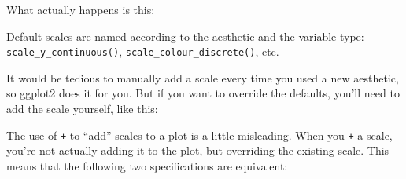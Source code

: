What actually happens is this:

\begin{Shaded}
\begin{Highlighting}[]
\OperatorTok{+}\StringTok{ }
\StringTok{  }\NormalTok{(}\NormalTok{(}\OperatorTok{+}
\StringTok{  }\NormalTok{() }\OperatorTok{+}\StringTok{ }
\StringTok{  }\NormalTok{() }\OperatorTok{+}\StringTok{ }
\StringTok{  }\NormalTok{()}
\end{Highlighting}
\end{Shaded}

Default scales are named according to the aesthetic and the variable
type: \texttt{scale\_y\_continuous()},
\texttt{scale\_colour\_discrete()}, etc.

It would be tedious to manually add a scale every time you used a new
aesthetic, so ggplot2 does it for you. But if you want to override the
defaults, you'll need to add the scale yourself, like this:

\begin{Shaded}
\begin{Highlighting}[]
\OperatorTok{+}\StringTok{ }
\StringTok{  }\NormalTok{(}\NormalTok{(}\OperatorTok{+}\StringTok{ }
\StringTok{  }\NormalTok{(}\NormalTok{) }\OperatorTok{+}
\StringTok{  }\NormalTok{(}\NormalTok{)}
\end{Highlighting}
\end{Shaded}

The use of \texttt{+} to ``add'' scales to a plot is a little
misleading. When you \texttt{+} a scale, you're not actually adding it
to the plot, but overriding the existing scale. This means that the
following two specifications are equivalent: \indexc{+}

